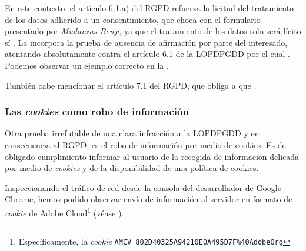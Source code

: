 En este contexto, el artículo 6.1.a) del RGPD refuerza la licitud del tratamiento de los datos adherido a un consentimiento, que choca con el formulario presentado por \textit{Mudanzas Benji}, ya que el tratamiento de los datos solo será lícito sí . La  incorpora la prueba de ausencia de afirmación por parte del interesado, atentando absolutamente contra el artículo 6.1 de la LOPDPGDD por el cual . Podemos observar un ejemplo correcto en la .


También cabe mencionar el artículo 7.1 del RGPD, que obliga a que .


\newpage
\subsubsection{Las \textit{cookies} como robo de información}
Otra prueba irrefutable de una clara infracción a la LOPDPGDD y en consecuencia al RGPD, es el robo de información por medio de cookies. Es de obligado cumplimiento informar al usuario de la recogida de información delicada por medio de \textit{cookies} y de la disponibilidad de una política de cookies.

Inspeccionando el tráfico de red desde la consola del desarrollador de Google Chrome, hemos podido observar envío de información al servidor en formato de \textit{cookie} de Adobe Cloud\footnote{Específicamente, la \textit{cookie} \texttt{AMCV\_802D40325A94210E0A495D7F\%40AdobeOrg}} (véase ).


